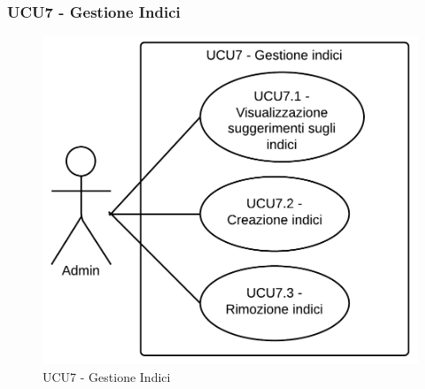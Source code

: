 \subsubsection{UCU7 - Gestione Indici}    
    \begin{figure}[H]
      \begin{center}
      \includegraphics[scale=0.16]{UML/UCU7 - Gestione Indici.png}
      \caption{UCU7 - Gestione Indici}
      \end{center} 
    \end{figure}    
    
